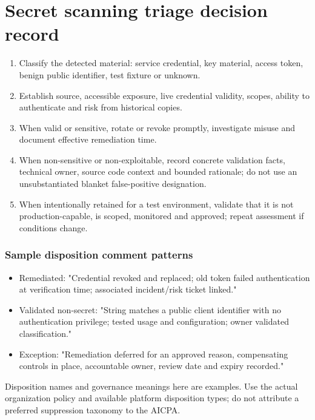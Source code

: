 \documentclass[10pt,oneside]{report}
\begin{document}
\chapter{Secret scanning triage decision record}
\begin{enumerate}
\item Classify the detected material: service credential, key material, access token, benign public identifier, test fixture or unknown.
\item Establish source, accessible exposure, live credential validity, scopes, ability to authenticate and risk from historical copies.
\item When valid or sensitive, rotate or revoke promptly, investigate misuse and document effective remediation time.
\item When non-sensitive or non-exploitable, record concrete validation facts, technical owner, source code context and bounded rationale; do not use an unsubstantiated blanket false-positive designation.
\item When intentionally retained for a test environment, validate that it is not production-capable, is scoped, monitored and approved; repeat assessment if conditions change.
\end{enumerate}

\subsection{Sample disposition comment patterns}
\begin{itemize}
\item Remediated: "Credential revoked and replaced; old token failed authentication at verification time; associated incident/risk ticket linked."
\item Validated non-secret: "String matches a public client identifier with no authentication privilege; tested usage and configuration; owner validated classification."
\item Exception: "Remediation deferred for an approved reason, compensating controls in place, accountable owner, review date and expiry recorded."
\end{itemize}

Disposition names and governance meanings here are examples. Use the actual organization policy and available platform disposition types; do not attribute a preferred suppression taxonomy to the AICPA.
\end{document}
